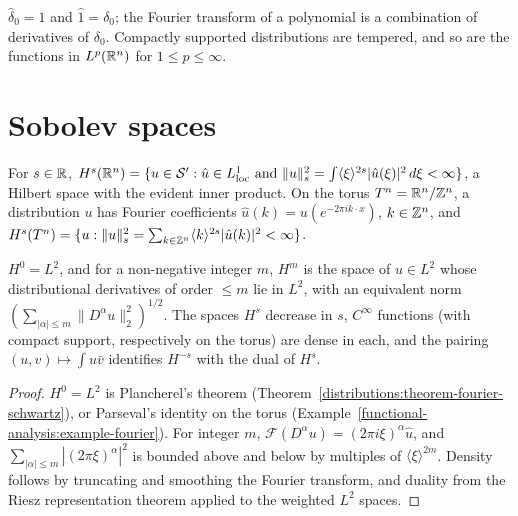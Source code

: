 \begin{example}\label{distributions:example-fourier-delta}
$\hat\delta_0 = 1$ and $\hat 1 = \delta_0$; the Fourier transform of a polynomial is a combination of derivatives of $\delta_0$. Compactly supported distributions are tempered, and so are the functions in
$L^p(\mathbb{R}^n)$ for $1 \leq p \leq \infty$.
\end{example}

\section{Sobolev spaces}\label{distributions:section-sobolev}

\begin{definition}\label{distributions:definition-sobolev}
For $s \in \mathbb{R}$, $H^s(\mathbb{R}^n) = \{u \in \mathcal{S}' : \hat u \in L^1_{\mathrm{loc}} \text{ and } \|u\|_s^2 = \int\langle\xi\rangle^{2s}|\hat u(\xi)|^2\,d\xi < \infty\}$, a Hilbert space with the evident inner
product. On the torus $T^n = \mathbb{R}^n/\mathbb{Z}^n$, a distribution $u$ has Fourier coefficients $\hat u(k) = u(e^{-2\pi ik\cdot x})$, $k \in \mathbb{Z}^n$, and
$H^s(T^n) = \{u : \|u\|_s^2 = \sum_{k \in \mathbb{Z}^n}\langle k \rangle^{2s}|\hat u(k)|^2 < \infty\}$.
\end{definition}

\begin{proposition}\label{distributions:proposition-sobolev-basic}
$H^0 = L^2$, and for a non-negative integer $m$, $H^m$ is the space of $u \in L^2$ whose distributional derivatives of order $\leq m$ lie in $L^2$, with an equivalent norm
$(\sum_{|\alpha| \leq m}\|D^\alpha u\|_2^2)^{1/2}$. The spaces $H^s$ decrease in $s$, $C^\infty$ functions (with compact support, respectively on the torus) are dense in each, and the pairing
$(u, v) \mapsto \int u\bar v$ identifies $H^{-s}$ with the dual of $H^s$.
\end{proposition}

\begin{proof}
$H^0 = L^2$ is Plancherel's theorem (Theorem~\ref{distributions:theorem-fourier-schwartz}), or Parseval's identity on the torus (Example~\ref{functional-analysis:example-fourier}). For integer $m$,
$\mathcal{F}(D^\alpha u) = (2\pi i\xi)^\alpha\hat u$, and $\sum_{|\alpha| \leq m}|(2\pi\xi)^\alpha|^2$ is bounded above and below by multiples of $\langle\xi\rangle^{2m}$. Density follows by truncating and
smoothing the Fourier transform, and duality from the Riesz representation theorem applied to the weighted $L^2$ spaces.
\end{proof}

